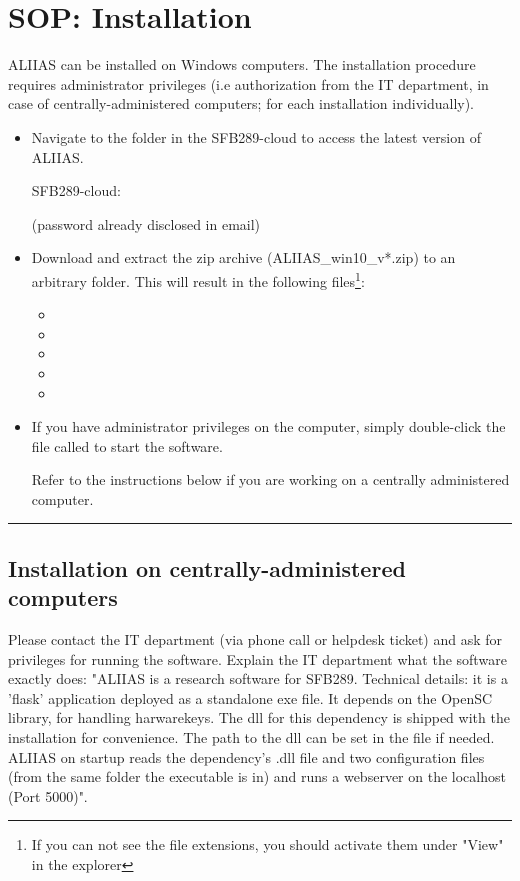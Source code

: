 \section{SOP: Installation}
\label{section:sop_installation}
ALIIAS can be installed on Windows computers. The installation procedure requires administrator privileges (i.e authorization from the IT department, in case of centrally-administered computers; for each installation individually).

\begin{itemize}
    \item Navigate to the  folder in the SFB289-cloud to access the latest version of ALIIAS.
    
    SFB289-cloud: \href{https://uni-duisburg-essen.sciebo.de/s/yYzEg59bvl8focL}{\color{pniblue}{https://uni-duisburg-essen.sciebo.de/s/yYzEg59bvl8focL}}
    
    (password already disclosed in email)
    
    \item Download and extract the zip archive (ALIIAS\_win10\_v*.zip) to an arbitrary folder. This will result in the following files\footnote{If you can not see the file extensions, you should activate them under "View" in the explorer}: 
    \begin{itemize}
        \item {}
        \item {}
        \item {}
        \item {} 
        \item {}
    \end{itemize}
    \item If you have administrator privileges on the computer, simply double-click the file called  to start the software.
    
    Refer to the instructions below if you are working on a centrally administered computer.
\end{itemize} 
\par\noindent\rule{\textwidth\color{pniblue}}{0.4pt}

\subsection*{Installation on centrally-administered computers}

Please contact the IT department (via phone call or helpdesk ticket) and ask for privileges for running the software. Explain the IT department what the software exactly does: "ALIIAS is a research software for SFB289. Technical details: it is a 'flask' application deployed as a standalone exe file. It depends on the OpenSC library, for handling harwarekeys. The dll for this dependency is shipped with the installation for convenience. The path to the dll can be set in the file  if needed. ALIIAS on startup reads the dependency's .dll file and two configuration files (from the same folder the executable is in) and runs a webserver on the localhost (Port 5000)".

